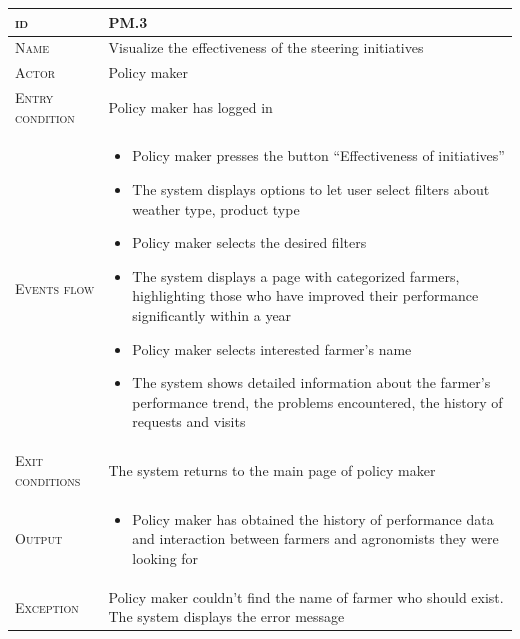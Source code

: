 \begin{table}[H]
    \centering
    \begin{tabular}{|l|p{}|}
        \hline %
    	\textsc{id}                 &   PM.3\\
    	\hline %
    	\textsc{Name}               &   Visualize the effectiveness of the steering initiatives\\
    	\hline %
    	\textsc{Actor}             &   Policy maker\\
    	\hline %
    	\textsc{Entry condition}   &   Policy maker has logged in\\
    	\hline %
    	\textsc{Events flow}         &   %
            	                        \begin{itemize}
                                    	    \item Policy maker presses the button “Effectiveness of initiatives”
                                    	    \item The system displays options to let user select filters about weather type, product type
                                    		\item Policy maker selects the desired filters
                                    		\item The system displays a page with categorized farmers, highlighting those who have improved their performance significantly within a year
                                    		\item Policy maker selects interested farmer’s name
                                    		\item The system shows detailed information about the farmer’s performance trend, the problems encountered, the history of requests and visits
                                        \end{itemize}\\
        \hline %
        \textsc{Exit conditions}    &  The system returns to the main page of policy maker\\
    	\hline %
    	\textsc{Output}             &  \begin{itemize}
    	    \item Policy maker has obtained the history of performance data and interaction between farmers and agronomists they were looking for
    	\end{itemize}\\
    	\hline %
    	\textsc{Exception}         &  Policy maker couldn’t find the name of farmer who should exist. The system displays the error message\\
    	\hline %
        

\end{tabular}
\end{table}
